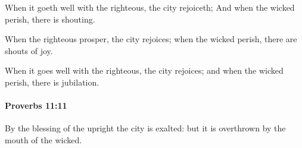 			\begin{versebox}
					\item[BHS] 
					\item[ASV] When it goeth well with the righteous, the city rejoiceth; And when the wicked perish, there is shouting.
					\item[NIV] When the righteous prosper, the city rejoices; when the wicked perish, there are shouts of joy.
					\item[NRSV] When it goes well with the righteous, the city rejoices; and when the wicked perish, there is jubilation.
			\end{versebox}

		\paragraph{Proverbs 11:11} %
			\label{PROVERBS-11-11}

			By the blessing of the upright the city is exalted: but it is overthrown by the mouth of the wicked.

